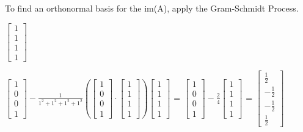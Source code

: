 \begin{tbox}
        To find an orthonormal basis for the im(A),
        apply the Gram-Schmidt Process.

        \hspace{0.5cm}
        \scriptsize
        $\begin{bmatrix}
            1 \\
            1 \\
            1 \\
            1
        \end{bmatrix}$

        \hspace{0.5cm}
        $\begin{bmatrix}
            1 \\
            0 \\
            0 \\
            1
        \end{bmatrix} -
        \frac{1}{1^2 + 1^2 + 1^2 + 1^2}
        (\begin{bmatrix}
            1 \\
            0 \\
            0 \\
            1
        \end{bmatrix} \cdot
        \begin{bmatrix}
            1 \\
            1 \\
            1 \\
            1
        \end{bmatrix})
        \begin{bmatrix}
            1 \\
            1 \\
            1 \\
            1
        \end{bmatrix}$ =
        $\begin{bmatrix}
            1 \\
            0 \\
            0 \\
            1
        \end{bmatrix} -
        \frac{2}{4}
        \begin{bmatrix}
            1 \\
            1 \\
            1 \\
            1
        \end{bmatrix}$ =
        $\begin{bmatrix}
            \frac{1}{2} \\
            -\frac{1}{2} \\
            -\frac{1}{2} \\
            \frac{1}{2}
        \end{bmatrix}$


\end{tbox}
